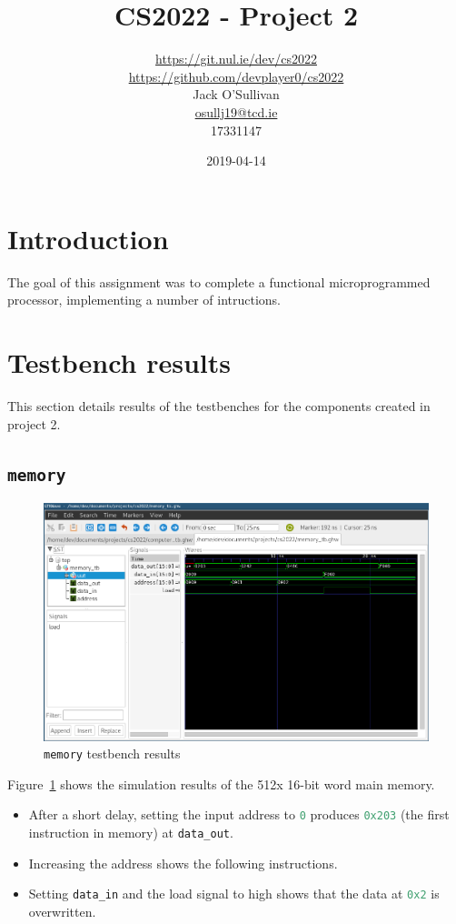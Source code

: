 \documentclass[a4paper]{article}
\title{CS2022 - Project 2}
\date{2019-04-14}
\author{\url{https://git.nul.ie/dev/cs2022}\\\url{https://github.com/devplayer0/cs2022}\\Jack O'Sullivan\\\href{mailto:osullj19@tcd.ie}{osullj19@tcd.ie}\\17331147}
\numberwithin{figure}{section}
\numberwithin{table}{section}
\newcommand{\mi}{\mintinline}
\begin{document}
\maketitle
\tableofcontents
{}

\newpage
{}
\section{Introduction}
The goal of this assignment was to complete a functional microprogrammed processor, implementing a number of intructions.

\section{Testbench results}
This section details results of the testbenches for the components created in project 2.

\subsection{\mi{c}{memory}}
\begin{figure}[h!]
	\centering
	\includegraphics[width=\textwidth]{memory_tb}
	\caption{\mi{c}{memory} testbench results}
	\label{fig:memory}
\end{figure}

Figure~\ref{fig:memory} shows the simulation results of the 512x 16-bit word main memory.
\begin{itemize}
	\item After a short delay, setting the input address to \mi{c}{0} produces \mi{c}{0x203} (the first 
		instruction in memory) at \mi{c}{data_out}.
	\item Increasing the address shows the following instructions.
	\item Setting \mi{c}{data_in} and the load signal to high shows that the data at \mi{c}{0x2} is overwritten.
\end{itemize}
\end{document}
